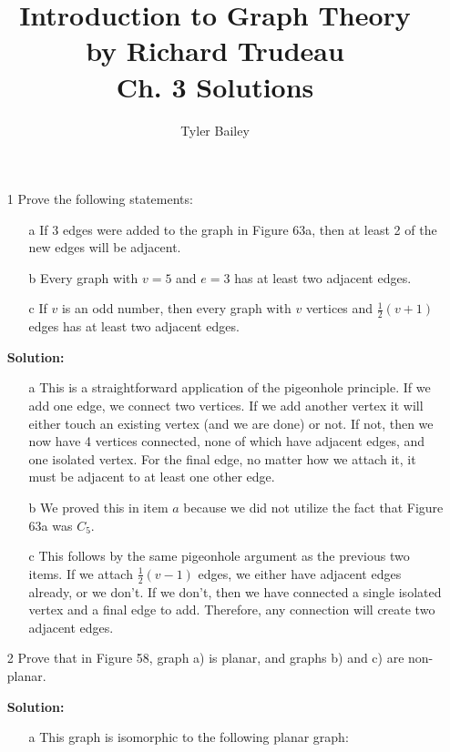 \documentclass{article}
\begin{document}
\title{%
  Introduction to Graph Theory \\
  \large by Richard Trudeau \\
   Ch. 3 Solutions}
   \author{Tyler Bailey}
\maketitle

\begin{enumerate}
	\item[1] Prove the following statements:
	
	\begin{enumerate}
		\item[a] If 3 edges were added to the graph in Figure 63a, then at least 2 of the new edges will be adjacent.
		\item[b] Every graph with $v = 5$ and $e = 3$ has at least two adjacent edges.
		\item[c] If $v$ is an odd number, then every graph with $v$ vertices and $\frac{1}{2}(v + 1)$ edges has at least two adjacent edges.
	\end{enumerate}
	
	\textbf{Solution:}
	\begin{enumerate}
		\item[a] This is a straightforward application of the pigeonhole principle. If we add one edge, we connect two vertices. If we add another vertex it will either touch an existing vertex (and we are done) or not. If not, then we now have 4 vertices connected, none of which have adjacent edges, and one isolated vertex. For the final edge, no matter how we attach it, it must be adjacent to at least one other edge.
		\item[b] We proved this in item $a$ because we did not utilize the fact that Figure 63a was $C_5$.
		\item[c] This follows by the same pigeonhole argument as the previous two items. If we attach $\frac{1}{2}(v - 1)$ edges, we either have adjacent edges already, or we don't. If we don't, then we have connected a single isolated vertex and a final edge to add. Therefore, any connection will create two adjacent edges.
	\end{enumerate}
	\item[2] Prove that in Figure 58, graph a) is planar, and graphs b) and c) are non-planar.
	
	\textbf{Solution:}
		\begin{enumerate}
			\item[a] This graph is isomorphic to the following planar graph:
			

\end{enumerate}
\end{enumerate}
\end{document}
